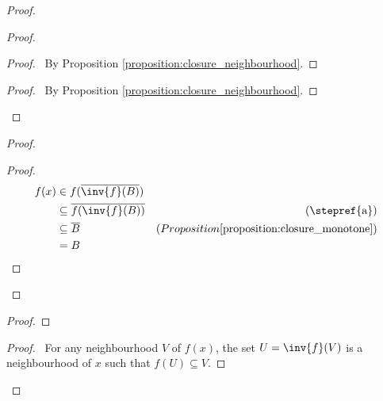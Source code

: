 \begin{proof}
    \pf
    \begin{proof}
        \begin{proof}
            \pf\ By Proposition \ref{proposition:closure_neighbourhood}.
        \end{proof}
        \qedstep
        \begin{proof}
            \pf\ By Proposition \ref{proposition:closure_neighbourhood}.
        \end{proof}
    \end{proof}
    \begin{proof}
        \begin{proof}
            \pf
            \begin{align*}
                f(x) & \in f(\overline{\inv{f}(B)}) \\
                & \subseteq \overline{f(\inv{f}(B))} & (\text{\stepref{a}})\\
                & \subseteq \overline{B} & (Proposition \ref{proposition:closure_monotone}) \\
                & = B
            \end{align*}
        \end{proof}
    \end{proof}
    \begin{proof}
    \end{proof}
    \begin{proof}
        \pf\ For any neighbourhood $V$ of $f(x)$, the set $U = \inv{f}(V)$ is a neighbourhood of $x$ such that
        $f(U) \subseteq V$.

\end{proof}
\end{proof}
